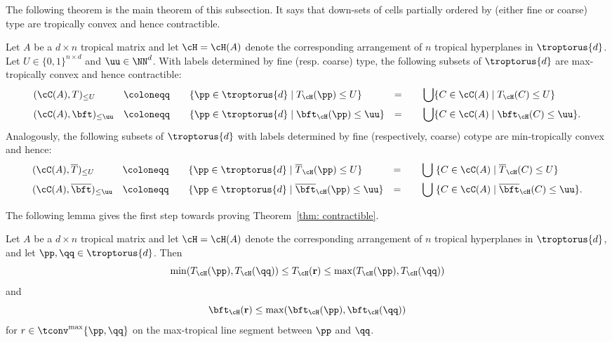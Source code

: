 The following theorem is the main theorem of this subsection. It says that down-sets of cells partially ordered by (either fine or coarse) type are tropically convex and hence contractible.

\begin{theorem}\label{thm: contractible} Let $A$ be a $d\times n$ tropical matrix and let $\cH = \cH(A)$ denote the corresponding arrangement of $n$ tropical hyperplanes in $\troptorus{d}$.
Let $U\in \{0,1\}^{n\times d}$ and $\uu\in \NN^d$.
With labels determined by fine (resp. coarse) type, the following subsets of $\troptorus{d}$ are max-tropically convex and hence contractible:
\begin{align*}
    &(\cC(A), T)_{\leq U} &\coloneqq \qquad&\{\pp\in \troptorus{d} \mid T_\cH(\pp)\leq U\} &= \qquad &\bigcup \{C\in \cC(A) \mid T_\cH(C) \leq U\} \\
    &(\cC(A), \bft)_{\leq \uu} &\coloneqq \qquad &\{\pp\in \troptorus{d} \mid \bft_{\cH}(\pp) \leq \uu\} &= \qquad &\bigcup \{C\in \cC(A) \mid \bft_\cH(C)\leq \uu\}.
\end{align*}
Analogously, the following subsets of $\troptorus{d}$ with labels determined by fine (respectively, coarse) cotype are min-tropically convex and hence:
\begin{align*}
    &(\cC(A), \overline{T})_{\leq U} &\coloneqq \qquad&\{\pp\in \troptorus{d} \mid \overline{T}_\cH(\pp)\leq U\} &= \qquad &\bigcup \; \{C\in \cC(A) \mid \overline{T}_\cH(C) \leq U\} \\
    &(\cC(A), \overline\bft)_{\leq \uu} &\coloneqq \qquad &\{\pp\in \troptorus{d} \mid \overline\bft_{\cH}(\pp) \leq \uu\} &= \qquad &\bigcup \; \{C\in \cC(A) \mid \overline\bft_\cH(C)\leq \uu\}.
\end{align*}
\end{theorem}

The following lemma gives the first step towards proving Theorem~\ref{thm: contractible}.

\begin{lemma}\label{lem: maxTropConvex}  Let $A$ be a $d\times n$ tropical matrix and let $\cH = \cH(A)$ denote the corresponding arrangement of $n$ tropical hyperplanes in $\troptorus{d}$, and let $\pp,\qq\in\troptorus{d}$. Then
$$
\min(T_\cH(\pp),T_\cH(\qq)) \leq T_\cH({\mathbf r}) \leq \max(T_\cH(\pp), T_\cH(\qq))
$$
and
$$
\bft_\cH({\mathbf r})\leq \max(\bft_\cH(\pp),\bft_\cH(\qq))
$$
for $r\in\tconv^{\max}\{\pp,\qq\}$ on the max-tropical line segment between $\pp$ and $\qq$.
\end{lemma}

